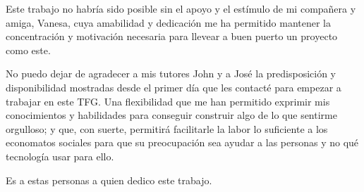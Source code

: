 \thispagestyle{empty}
\vspace{1cm}

\par Este trabajo no habría sido posible sin el apoyo y el estímulo de mi compañera y amiga, Vanesa, cuya amabilidad y dedicación me ha permitido mantener la concentración y motivación necesaria para llevear a buen puerto un proyecto como este.
\par No puedo dejar de agradecer a mis tutores John y a José la predisposición y disponibilidad mostradas desde el primer día que les contacté para empezar a trabajar en este TFG. Una flexibilidad que me han permitido exprimir mis conocimientos y habilidades para conseguir construir algo de lo que sentirme orgulloso; y que, con suerte, permitirá facilitarle la labor lo suficiente a los economatos sociales para que su preocupación sea ayudar a las personas y no qué tecnología usar para ello.
\par Es a estas personas a quien dedico este trabajo.

\cleardoublepage %


